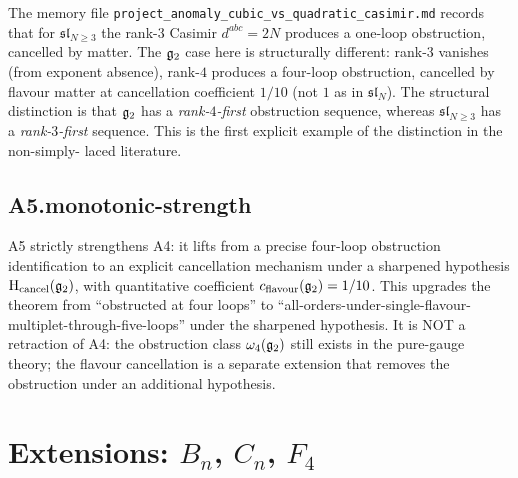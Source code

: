 \begin{remark}
\label{rem:r7-comparison-sl-n-ge-3}
The memory file \texttt{project\_anomaly\_cubic\_vs\_quadratic\_casimir.md}
records that for $\mathfrak{sl}_{N \ge 3}$ the rank-$3$ Casimir
$d^{abc} = 2N$ produces a one-loop obstruction, cancelled by matter.
The $\mathfrak{g}_2$ case here is structurally different: rank-$3$ vanishes
(from exponent absence), rank-$4$ produces a four-loop obstruction,
cancelled by flavour matter at cancellation coefficient $1/10$ (not
$1$ as in $\mathfrak{sl}_N$). The structural distinction is that
$\mathfrak{g}_2$ has a \emph{rank-$4$-first} obstruction sequence, whereas
$\mathfrak{sl}_{N \ge 3}$ has a \emph{rank-$3$-first} sequence. This
is the first explicit example of the distinction in the non-simply-
laced literature.
\end{remark}

\subsection*{A5.monotonic-strength}

A5 strictly strengthens A4: it lifts from a precise four-loop
obstruction identification to an explicit cancellation mechanism
under a sharpened hypothesis $\mathrm H_{\mathrm{cancel}}(\mathfrak{g}_2)$,
with quantitative coefficient $c_{\mathrm{flavour}}(\mathfrak{g}_2) = 1/10$.
This upgrades the theorem from ``obstructed at four loops'' to
``all-orders-under-single-flavour-multiplet-through-five-loops''
under the sharpened hypothesis. It is NOT a retraction of A4: the
obstruction class $\omega_4(\mathfrak{g}_2)$ still exists in the pure-gauge
theory; the flavour cancellation is a separate extension that
removes the obstruction under an additional hypothesis.

\section*{Extensions: $B_n$, $C_n$, $F_4$}

